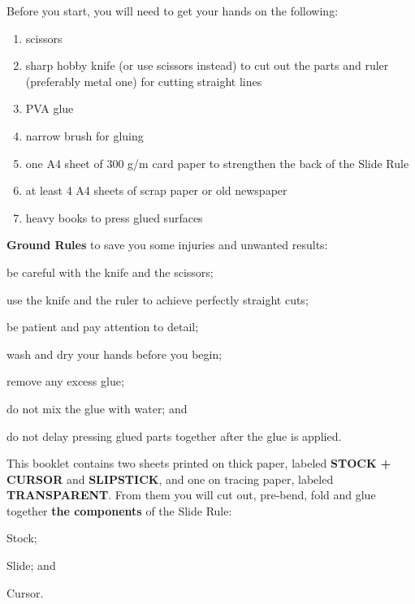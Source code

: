 \documentclass[a4paper,9pt]{article}
\begin{document}
  \begin{multicols*}{3}
  \normalsize{Before you start, you will need to get your hands on the following:
    \begin{enumerate}
      \setlength{\parskip}{0pt}
      \setlength{\parsep}{0pt}
      \item scissors
      \item sharp hobby knife (or use scissors instead) to cut out the parts and ruler (preferably metal one) for cutting straight lines
      \item PVA glue
      \item narrow brush for gluing
      \item one A4 sheet of 300 g/m card paper to strengthen the back of the Slide Rule
      \item at least 4 A4 sheets of scrap paper or old newspaper
      \item heavy books to press glued surfaces
    \end{enumerate}

  \textbf{Ground Rules} to save you some injuries and unwanted results:
    \begin{inparaenum}
      \item be careful with the knife and the scissors;
      \item use the knife and the ruler to achieve perfectly straight cuts;
      \item be patient and pay attention to detail;
      \item wash and dry your hands before you begin;
      \item remove any excess glue;
      \item do not mix the glue with water; and
      \item do not delay pressing glued parts together after the glue is applied.
    \end{inparaenum}

  This booklet contains two sheets printed on thick paper, labeled \textbf{STOCK + CURSOR} and \textbf{SLIPSTICK}, and one on tracing paper, labeled \textbf{TRANSPARENT}. From them you will cut out, pre-bend, fold and glue together \textbf{the components} of the Slide Rule:
    \begin{inparaenum}
      \item Stock;
      \item Slide; and
      \item Cursor.
    \end{inparaenum}

}
\end{multicols*}
\end{document}
